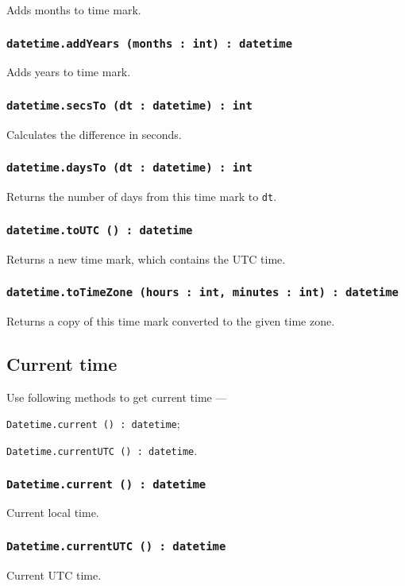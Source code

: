 Adds months to time mark.

\subsubsection{\texttt{datetime.addYears (months : int) : datetime}}

Adds years to time mark.

\subsubsection{\texttt{datetime.secsTo (dt : datetime) : int}}

Calculates the difference in seconds.

\subsubsection{\texttt{datetime.daysTo (dt : datetime) : int}}

Returns the number of days from this time mark to \texttt{dt}.

\subsubsection{\texttt{datetime.toUTC () : datetime}}

Returns a new time mark, which contains the UTC time.

\subsubsection{\texttt{datetime.toTimeZone (hours : int, minutes : int) : datetime}}

Returns a copy of this time mark converted to the given time zone.

\subsection{Current time}

Use following methods to get current time —
\begin{icItems}
	\item \texttt{Datetime.current () : datetime};
	\item \texttt{Datetime.currentUTC () : datetime}.
\end{icItems}

\subsubsection{\texttt{Datetime.current () : datetime}}

Current local time.

\subsubsection{\texttt{Datetime.currentUTC () : datetime}}

Current UTC time.
